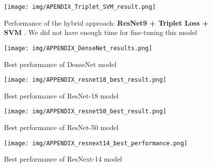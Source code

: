 \documentclass[10pt,twocolumn,letterpaper]{article}
\begin{document}
 \begin{figure}[h!]
   \centering
       \texttt{[image: img/APENDIX\_Triplet\_SVM\_result.png]}
   \caption{Performance of the hybrid approach: \textbf{ResNet9 + Triplet Loss + SVM }. We did not have enough time for fine-tuning this model\label{figure:triplet_svm_curves}}
 \end{figure}

 \begin{figure}[h!]

       \texttt{[image: img/APPENDIX\_DenseNet\_results.png]}
   \caption{Best performance of DenseNet model\label{figure:densenet}}
 \end{figure} 

 \begin{figure}[h!]

       \texttt{[image: img/APPENDIX\_resnet18\_best\_result.png]}
   \caption{Best performance of ResNet-18 model\label{figure:resnet18}}
 \end{figure}
 
 \begin{figure}[h!]

       \texttt{[image: img/APPENDIX\_resnet50\_best\_result.png]}
   \caption{Best performance of ResNet-50 model\label{figure:resnet50}}
 \end{figure}

 \begin{figure}[h!]

       \texttt{[image: img/APPENDIX\_resnext14\_best\_performance.png]}
   \caption{Best performance of ResNext-14 model\label{figure:resnext14}}
 \end{figure} 



\end{document}
